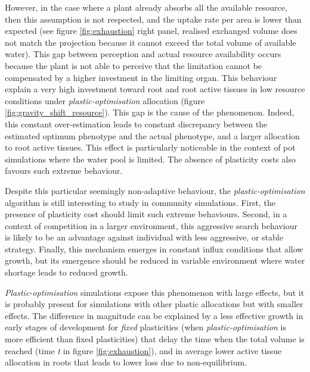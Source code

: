 However, in the case where a plant already absorbs all the available resource, then this assumption is not respected, and the uptake rate per area is lower than expected (see figure \ref{fig:exhaustion} right panel, realised exchanged volume does not match the projection because it cannot exceed the total volume of available water). This gap between perception and actual resource availability occurs because the plant is not able to perceive that the limitation cannot be compensated by a higher investment in the limiting organ. This behaviour explain a very high investment toward root and root active tissues in low resource conditions under \textit{plastic-optimisation} allocation (figure \ref{fig:gravity_shift_resource}). This gap is the cause of the  phenomenon. Indeed, this constant over-estimation leads to constant discrepancy between the estimated optimum phenotype and the actual phenotype, and a larger allocation to root active tissues. This effect is particularly noticeable in the context of pot simulations where the water pool is limited. The absence of plasticity costs also favours such extreme behaviour. 

Despite this particular seemingly non-adaptive behaviour, the \textit{plastic-optimisation} algorithm is still interesting to study in community simulations. First, the presence of plasticity cost should limit such extreme behaviours. Second, in a context of competition in a larger environment, this aggressive search behaviour is likely to be an advantage against individual with less aggressive, or stable strategy. Finally, this mechanism emerges in constant influx conditions that allow growth, but its emergence should be reduced in variable environment where water shortage leads to reduced growth.

\textit{Plastic-optimisation} simulations expose this phenomenon with large effects, but it is probably present for simulations with other plastic allocations but with smaller effects. The difference in magnitude can be explained by a less effective growth in early stages of development for \textit{fixed} plasticities (when \textit{plastic-optimisation} is more efficient than fixed plasticities) that delay the time when the total volume is reached (time \textit{t} in figure \ref{fig:exhaustion}), and in average lower active tissue allocation in roots that leads to lower loss due to non-equilibrium.

